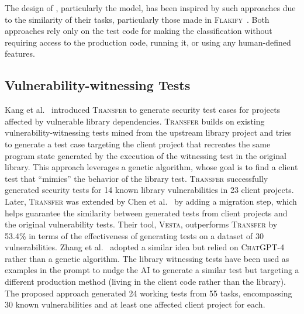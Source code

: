 The design of \vuteco, particularly the \finder model, has been inspired by such approaches due to the similarity of their tasks, particularly those made in \textsc{Flakify}~\cite{fatima:tse2023:flakify}.
Both approaches rely only on the test code for making the classification without requiring access to the production code, running it, or using any human-defined features.
%


\subsection{Vulnerability-witnessing Tests}

Kang et al.~\cite{kang:issta2022:transfer} introduced \textsc{Transfer} to generate security test cases for \Java projects affected by vulnerable library dependencies.
\textsc{Transfer} builds on existing vulnerability-witnessing tests mined from the upstream library project and tries to generate a test case targeting the client project that recreates the same program state generated by the execution of the witnessing test in the original library.
This approach leverages a genetic algorithm, whose goal is to find a client test that ``mimics'' the behavior of the library test.
\textsc{Transfer} successfully generated security tests for 14 known library vulnerabilities in 23 client projects.
Later, \textsc{Transfer} was extended by Chen et al.~\cite{chen:icse2024:vesta} by adding a migration step, which helps guarantee the similarity between generated tests from client projects and the original vulnerability tests.
Their tool, \textsc{Vesta}, outperforms \textsc{Transfer} by 53.4\% in terms of the effectiveness of generating tests on a dataset of 30 \Java vulnerabilities.
%
Zhang et al.~\cite{zhang:2023:llm:sectests} adopted a similar idea but relied on \textsc{ChatGPT}-4 rather than a genetic algorithm.
The library witnessing tests have been used as examples in the prompt to nudge the AI to generate a similar test but targeting a different production method (living in the client code rather than the library).
The proposed approach generated 24 working tests from 55 tasks, encompassing 30 known vulnerabilities and at least one affected client project for each.

